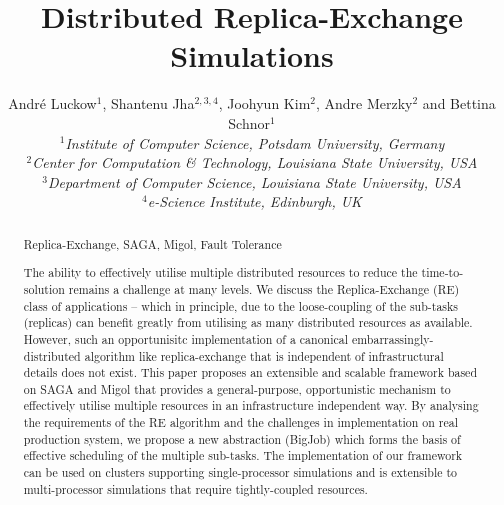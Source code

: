 \documentclass{rspublic}
\title[Distributed Replica-Exchange Simulations]{Distributed
  Replica-Exchange Simulations}
\author[Luckow, Jha, Kim, Merzky, Schnor]{
  Andr\'e Luckow$^{1}$, Shantenu Jha$^{2,3,4}$, Joohyun Kim$^{2}$, Andre Merzky$^{2}$ and Bettina Schnor$^{1}$\\
  \small{\emph{$^{1}$Institute of Computer Science, Potsdam University, Germany}}\\
  \small{\emph{$^{2}$Center for Computation \& Technology, Louisiana State University, USA}}\\
  \small{\emph{$^{3}$Department of Computer Science, Louisiana State
      University, USA}}\\
  \small{\emph{$^{4}$e-Science Institute, Edinburgh, UK}}\\
}
\begin{document}
 


\maketitle    

\begin{abstract}{Replica-Exchange, SAGA, Migol, Fault Tolerance}  


  The ability to effectively utilise multiple distributed resources to
  reduce the time-to-solution remains a challenge at many levels.  We
  discuss the Replica-Exchange (RE) class of applications -- which in
  principle, due to the loose-coupling of the sub-tasks (replicas) can
  benefit greatly from utilising as many distributed resources as
  available.  However, such an opportunisitc implementation of a
  canonical embarrassingly-distributed algorithm like replica-exchange
  that is independent of infrastructural details does not exist.  This
  paper proposes an extensible and scalable framework based on SAGA
  and Migol that provides a general-purpose, opportunistic mechanism
  to effectively utilise multiple resources in an infrastructure
  independent way. By analysing the requirements of the RE algorithm
  and the challenges in implementation on real production system, we
  propose a new abstraction (BigJob) which forms the basis of
  effective scheduling of the multiple sub-tasks. The implementation
  of our framework can be used on clusters supporting single-processor
  simulations and is extensible to multi-processor simulations that
  require tightly-coupled resources.




\end{abstract}
\end{document}

